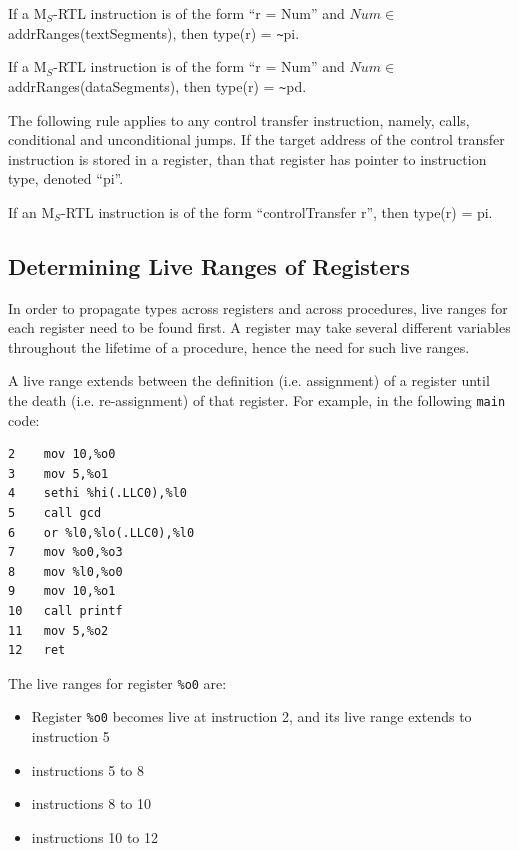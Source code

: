 \begin{typerule}
If a M$_S$-RTL instruction is of the form ``r = Num'' and 
$Num \in$ addrRanges(textSegments), then type(r) = \verb!~!pi.
\label{rule-llpi}
\end{typerule}

\begin{typerule}
If a M$_S$-RTL instruction is of the form ``r = Num'' and 
$Num \in$ addrRanges(dataSegments), then type(r) = \verb!~!pd.
\label{rule-llpd}
\end{typerule}

The following rule applies to any control transfer instruction, 
namely, calls, conditional and unconditional jumps. 
If the target address of the control transfer instruction is 
stored in a register, than that register has pointer to 
instruction type, denoted ``pi''. 

\begin{typerule}
If an M$_S$-RTL instruction is of the form ``controlTransfer r'', then 
type(r) = pi. 
\label{rule-pi}
\end{typerule}


\subsection{Determining Live Ranges of Registers}
In order to propagate types across registers and across 
procedures, live ranges for each register need to be found
first.  A register may take several different variables 
throughout the lifetime of a procedure, hence the need for 
such live ranges. 

A live range extends between the definition (i.e. assignment)
of a register until the death (i.e. re-assignment) of that register.
For example, in the following \texttt{main} code:
\begin{verbatim}
2    mov 10,%o0
3    mov 5,%o1
4    sethi %hi(.LLC0),%l0
5    call gcd
6    or %l0,%lo(.LLC0),%l0
7    mov %o0,%o3
8    mov %l0,%o0
9    mov 10,%o1
10   call printf
11   mov 5,%o2
12   ret
\end{verbatim}

The live ranges for register \texttt{\%o0} are: 
\begin{itemize}
\item Register \texttt{\%o0} becomes live at instruction 2,
    and its live range extends to instruction 5
\item instructions 5 to 8
\item instructions 8 to 10
\item instructions 10 to 12
\end{itemize}


